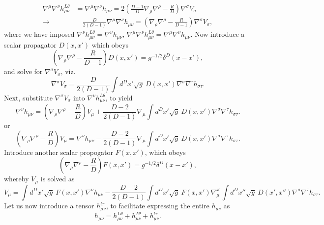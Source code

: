 \documentclass[10pt,letterpaper]{article}
\begin{document}
\begin{align}
\nabla^\mu \nabla^\nu h_{\mu\nu}^{L\theta} &=\nabla^\mu \nabla^\nu h_{\mu\nu}= 2\left(\frac{D-1}{D}\nabla_\rho \nabla^\rho - \frac{R}{D}\right) \nabla^\sigma V_\sigma 
\nonumber
\\
\to& \quad \frac{D}{2(D-1)}\nabla^\mu \nabla^\nu h_{\mu\nu}  = \left( \nabla_\rho \nabla^\rho - \frac{R}{D-1}\right)\nabla^\sigma V_\sigma,
\end{align}
where we have imposed $\nabla^\nu h_{\mu\nu}^{L\theta} = \nabla^\nu h_{\mu\nu}$, $\nabla^\mu \nabla^\nu h_{\mu\nu}^{L\theta} =\nabla^\mu \nabla^\nu h_{\mu\nu}$.
Now introduce a scalar propagator $D(x,x')$ which obeys
\begin{equation}
\left( \nabla_\rho \nabla^\rho - \frac{R}{D-1}\right)D(x,x') = g^{-1/2} \delta^D (x-x'),
\end{equation}
and solve for $\nabla^\sigma V_\sigma$, viz.
\begin{equation}
\nabla^\sigma V_\sigma = \frac{D}{2(D-1)} \int d^Dx' \sqrt{g}\ D(x,x')\nabla^\sigma \nabla^\tau h_{\sigma\tau}.
\end{equation}
Next, substitute $\nabla^\sigma V_\sigma$ into $\nabla^\nu h_{\mu\nu}^{L\theta}$, to yield
\begin{equation}
\nabla^\nu h_{\mu\nu}=  \left( \nabla_\rho \nabla^\rho - \frac{R}{D}\right) V_\mu
+ \frac{D-2}{2(D-1)} \nabla_\mu  \int d^Dx' \sqrt{g}\ D(x,x')\nabla^\sigma \nabla^\tau h_{\sigma\tau}.
\end{equation}
or
\begin{equation}
  \left( \nabla_\rho \nabla^\rho - \frac{R}{D}\right) V_\mu = \nabla^\nu h_{\mu\nu}- \frac{D-2}{2(D-1)} \nabla_\mu  \int d^Dx' \sqrt{g}\ D(x,x')\nabla^\sigma \nabla^\tau h_{\sigma\tau}.
\end{equation}
Introduce another scalar propogator $F(x,x')$, which obeys
\begin{equation}
\left( \nabla_\rho \nabla^\rho - \frac{R}{D}\right)F(x,x') = g^{-1/2} \delta^D(x-x'),
\end{equation}
whereby $V_\mu$ is solved as
\begin{equation}
V_\mu =   \int d^Dx' \sqrt{g}\ F(x,x') \nabla^\nu h_{\mu\nu}- \frac{D-2}{2(D-1)}  \int d^Dx' \sqrt{g}\ F(x,x') \nabla_\mu^{x'}  \int d^Dx'' \sqrt{g}\ D(x',x'')\nabla^\sigma \nabla^\tau h_{\sigma\tau}.
\end{equation}
Let us now introduce a tensor $h_{\mu\nu}^{tr}$, to facilitate expressing the entire $h_{\mu\nu}$ as
\begin{equation}
h_{\mu\nu} = h_{\mu\nu}^{L\theta} + h_{\mu\nu}^{T\theta} + h_{\mu\nu}^{tr}.
\end{equation}
\end{document}
